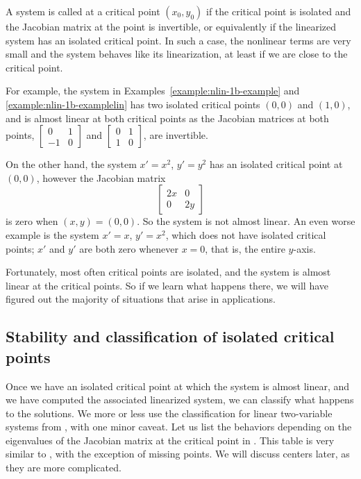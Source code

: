 A system is called \emph{} at a critical point
$(x_0,y_0)$ if the critical point is isolated and the Jacobian matrix at the point
is invertible, or equivalently if the linearized system has an isolated
critical point.  In such a case, the nonlinear terms are very small
and the system behaves like its linearization, at least if we are close
to the critical point.

For example, the system in
Examples~\ref{example:nlin-1b-example} and \ref{example:nlin-1b-examplelin}
has two isolated critical points $(0,0)$ and $(1,0)$, and
is almost linear at both critical points as 
the Jacobian matrices at both points,
$\left[ \begin{smallmatrix} 0 & 1 \\ -1 & 0 \end{smallmatrix} \right]$ and
$\left[ \begin{smallmatrix} 0 & 1 \\ 1 & 0 \end{smallmatrix} \right]$,
are invertible.

On the other hand, the system $x' = x^2$, $y' = y^2$ has an isolated
critical point at $(0,0)$, however the Jacobian matrix
\begin{equation*}
\begin{bmatrix} 2x & 0 \\ 0 & 2y \end{bmatrix}
\end{equation*}
is zero when $(x,y) = (0,0)$.  So the system is not almost
linear.
An even worse example is the system $x' = x$, $y' = x^2$, which does not have 
isolated critical points; $x'$ and $y'$ are both zero
whenever $x=0$, that is, the entire $y$-axis.

Fortunately, most often critical
points are isolated, and the system is almost linear at the critical
points.  So if we learn what happens there, we will have figured out the majority
of situations that arise in applications.



\subsection{Stability and classification of isolated critical points}

Once we have an isolated critical point at which the system is almost linear,
and we have computed the associated linearized system,
we can classify what happens to the 
solutions.  We more or less use the classification for linear
two-variable systems from , with one minor
caveat.
Let us list the behaviors depending on the eigenvalues of
the Jacobian matrix at the critical point in .
This table is very similar to , with
the exception of missing  points.
We will discuss centers later, as they are more complicated.

